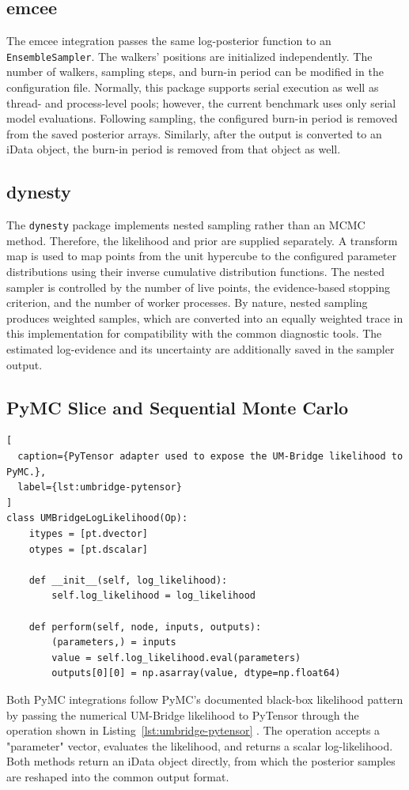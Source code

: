 \subsection{emcee}
\label{sec:integration-emcee}

The emcee integration passes the same log-posterior function to an \texttt{EnsembleSampler}. The walkers' positions are initialized independently. The number of walkers, sampling steps, and burn-in period can be modified in the configuration file. Normally, this package supports serial execution as well as thread- and process-level pools; however, the current benchmark uses only serial model evaluations. Following sampling, the configured burn-in period is removed from the saved posterior arrays. Similarly, after the output is converted to an iData object, the burn-in period is removed from that object as well.

\subsection{dynesty}
\label{sec:integration-dynesty}

The \texttt{dynesty} package implements nested sampling rather than an MCMC method. Therefore, the likelihood and prior are supplied separately. A transform map is used to map points from the unit hypercube to the configured parameter distributions using their inverse cumulative distribution functions. The nested sampler is controlled by the number of live points, the evidence-based stopping criterion, and the number of worker processes. By nature, nested sampling produces weighted samples, which are converted into an equally weighted trace in this implementation for compatibility with the common diagnostic tools. The estimated log-evidence and its uncertainty are additionally saved in the sampler output.

\subsection{PyMC Slice and Sequential Monte Carlo}
\label{sec:integration-pymc}

\begin{lstlisting}[
  caption={PyTensor adapter used to expose the UM-Bridge likelihood to PyMC.},
  label={lst:umbridge-pytensor}
]
class UMBridgeLogLikelihood(Op):
    itypes = [pt.dvector]
    otypes = [pt.dscalar]

    def __init__(self, log_likelihood):
        self.log_likelihood = log_likelihood

    def perform(self, node, inputs, outputs):
        (parameters,) = inputs
        value = self.log_likelihood.eval(parameters)
        outputs[0][0] = np.asarray(value, dtype=np.float64)
\end{lstlisting}

Both PyMC integrations follow PyMC's documented black-box likelihood pattern by passing the numerical UM-Bridge likelihood to PyTensor through the operation shown in Listing~\ref{lst:umbridge-pytensor} \autocite{Pitkin2024}. The operation accepts a "parameter" vector, evaluates the likelihood, and returns a scalar log-likelihood. Both methods return an iData object directly, from which the posterior samples are reshaped into the common output format.
